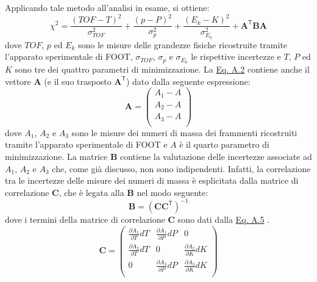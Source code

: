 \documentclass[12pt,a4paper,twoside]{report}
\newcommand{\matr}[1]{\boldsymbol{#1}}
\newcommand{\transp}[1]{{#1}^{\mathsf{T}}}
\newcommand{\vect}[1]{\boldsymbol{#1}}
\begin{document}
\begin{appendices}
		Applicando tale metodo all'analisi in esame, si ottiene:
		\begin{equation}
			\chi^2=\frac{\left(TOF-T\right)^2}{\sigma^2_{TOF}}+\frac{\left(p-P\right)^2}{\sigma^2_{p}}+\frac{\left(E_k-K\right)^2}{\sigma^2_{E_k}}+\transp{\vect{A}}\matr{B}\vect{A}
			\label{eq:chi_square}
		\end{equation}
		dove $TOF$, $p$ ed $E_k$ sono le misure delle grandezze fisiche ricostruite tramite l'apparato sperimentale di FOOT, $\sigma_{TOF}$, $\sigma_{p}$ e $\sigma_{E_k}$ le rispettive incertezze e $T$, $P$ ed $K$ sono tre dei quattro parametri di minimizzazione. La \hyperref[eq:chi_square]{Eq. A.2} contiene anche il vettore $\vect{A}$ (e il suo trasposto $\transp{\vect{A}}$) dato dalla seguente espressione:
		\begin{equation}
			\vect{A}=
			\begin{pmatrix}
				A_1-A\\
				A_2-A \\
				A_3-A\\
			\end{pmatrix}
			\label{eq:vector_A}
		\end{equation}
		dove $A_1$, $A_2$ e $A_3$ sono le misure dei numeri di massa dei frammenti ricostruiti tramite l'apparato sperimentale di FOOT e $A$ è il quarto parametro di minimizzazione. La matrice $\matr{B}$ contiene la valutazione delle incertezze associate ad $A_1$, $A_2$ e $A_3$ che, come già discusso, non sono indipendenti. Infatti, la correlazione tra le incertezze delle misure dei numeri di massa è esplicitata dalla matrice di correlazione $\matr{C}$, che è legata alla $\matr{B}$ nel modo seguente:
		\begin{equation}
			\matr{B}=\left(\matr{C}\transp{\matr{C}}\right)^{-1}
			\label{eq:B_funct_C}
		\end{equation}
		dove i termini della matrice di correlazione $\matr{C}$ sono dati dalla \hyperref[eq:correlation_matrix]{Eq. A.5} \cite{foot_cdr,valle2019design}.
		\begin{equation}
			\matr{C}=
			\begin{pmatrix}
				\frac{\partial A_1}{\partial T}dT&\frac{\partial A_1}{\partial P}dP&0\\
				\frac{\partial A_2}{\partial T}dT&0&\frac{\partial A_2}{\partial K}dK\\
				0&\frac{\partial A_3}{\partial P}dP&\frac{\partial A_3}{\partial K}dK\\
			\end{pmatrix}
			\label{eq:correlation_matrix}

\end{equation}
\end{appendices}
\end{document}
